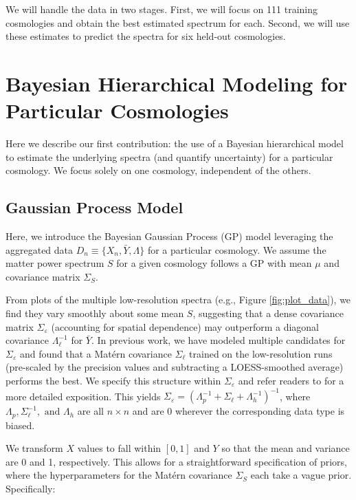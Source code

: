 \documentclass[11pt]{article}
\begin{document}
We will handle the data in two stages.  First, we will focus on 111 training cosmologies and obtain the best estimated spectrum for each.  Second, we will use these estimates to predict the spectra for six held-out cosmologies.

\section{Bayesian Hierarchical Modeling for Particular Cosmologies}
\label{sec:hm_fit}

Here we describe our first contribution: the use of a Bayesian hierarchical model to estimate the underlying spectra (and quantify uncertainty) for a particular cosmology.  We focus solely on one cosmology, independent of the others.

\subsection{Gaussian Process Model}

Here, we introduce the Bayesian Gaussian Process (GP) model leveraging the aggregated data $D_n \equiv \{X_n, \bar Y, \Lambda\}$ for a particular cosmology. We assume the matter power spectrum $S$ for a given cosmology follows a GP with mean $\mu$ and covariance matrix $\Sigma_S$.

From plots of the multiple low-resolution spectra (e.g., Figure \ref{fig:plot_data}), we find they vary smoothly about some mean $S$, suggesting that a dense covariance matrix $\Sigma_\varepsilon$ (accounting for spatial dependence) may outperform a diagonal covariance $\Lambda_\ell^{-1}$ for $\bar Y$. In previous work, we have modeled multiple candidates for $\Sigma_\varepsilon$ \citep{walsh2023bayesian} and found that a Mat\'ern covariance $\Sigma_\ell$ trained on the low-resolution runs (pre-scaled by the precision values and subtracting a LOESS-smoothed average) performs the best. We specify this structure within $\Sigma_\varepsilon$ and refer readers to \cite{walsh2023bayesian} for a more detailed exposition. This yields $\Sigma_\varepsilon=\left(\Lambda_p^{-1} + \Sigma_\ell + \Lambda_h^{-1}\right)^{-1}$, where $\Lambda_p, \Sigma_\ell^{-1}, \text{ and } \Lambda_h$ are all $n\times n$ and are 0 wherever the corresponding data type is biased.

We transform $X$ values to fall within $[0,1]$ and $Y$ so that the mean and variance are 0 and 1, respectively. This allows for a straightforward specification of priors, where the hyperparameters for the Mat\'ern covariance $\Sigma_S$ each take a vague prior. Specifically:
\end{document}
